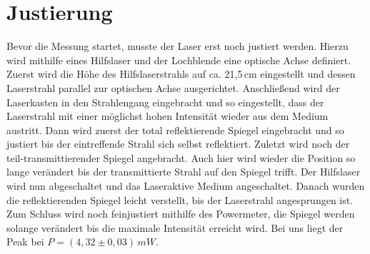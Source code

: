 \section{Justierung}
Bevor die Messung startet, musste der Laser erst noch justiert werden.
Hierzu wird mithilfe eines Hilfslaser und der Lochblende eine optische Achse definiert. 
Zuerst wird die Höhe des Hilfslaserstrahls auf ca. 21,5\,cm eingestellt und dessen Laserstrahl
parallel zur optischen Achse ausgerichtet. 
Anschließend wird der Laserkasten in den Strahlengang eingebracht und so eingestellt, dass 
der Laserstrahl mit einer möglichst hohen Intensität wieder aus dem Medium austritt. 
Dann wird zuerst der total reflektierende Spiegel eingebracht und so justiert bis der 
eintreffende Strahl sich selbst reflektiert. 
Zuletzt wird noch der teil-transmittierender Spiegel angebracht. Auch hier 
wird wieder die Position so lange verändert bis der transmittierte Strahl auf 
den Spiegel trifft. 
Der Hilfslaser wird nun abgeschaltet und das Laseraktive Medium angeschaltet.
Danach wurden die reflektierenden Spiegel leicht verstellt, bis der Laserstrahl angesprungen ist.
Zum Schluss wird noch feinjustiert mithilfe des Powermeter, die Spiegel werden solange 
verändert bis die maximale Intensität erreicht wird. Bei uns liegt der Peak bei 
$P = (4,32 \pm 0,03)\,mW$.





